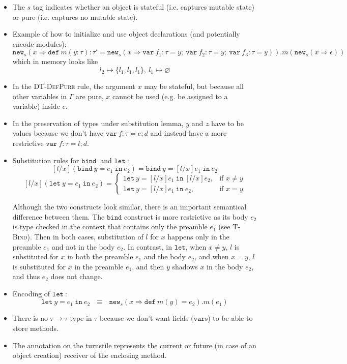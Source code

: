 \documentclass{llncs}
\newcommand{\keywadj}[1]{\mathtt{#1}}
\newcommand{\keyw}[1]{\keywadj{#1}~}
\begin{document}
\begin{itemize}
\item The $s$ tag indicates whether an object is stateful (i.e. captures mutable state) or pure (i.e. captures no mutable state).
\item Example of how to initialize and use object declarations (and potentially encode modules):
\[
\keywadj{new}_{s}(x \Rightarrow \keyw{def} m(y : \tau) : \tau' = \keywadj{new}_{s}(x \Rightarrow \keyw{var} f_1 : \tau = y;~\keyw{var} f_2 : \tau = y;~\keyw{var} f_3 : \tau = y)).m(\keywadj{new}_{s} (x \Rightarrow \epsilon))
\]
which in memory looks like 
\[
l_2 \mapsto \{l_1,l_1,l_1\},~l_1 \mapsto \varnothing
\]
\item In the \textsc{DT-DefPure} rule, the argument $x$ may be stateful, but because all other variables in $\Gamma$ are pure, $x$ cannot be used (e.g. be assigned to a variable) inside $e$.
\item In the preservation of types under substitution lemma, $y$ and $z$ have to be values because we don't have $\keyw{var} f:\tau = e; d$ and instead have a more restrictive $\keyw{var} f:\tau = l;d$.
\item Substitution rules for $\keyw{bind}$ and $\keyw{let}$:
\[
    [l/x](\keyw{bind} y = e_1~\keyw{in} e_2) = \keyw{bind} y = [l/x]e_1~\keyw{in} e_2
\]
\[
    [l/x](\keyw{let} y = e_1~\keyw{in} e_2) = 
\begin{cases}
    \keyw{let} y = [l/x]e_1~\keyw{in} [l/x]e_2, & \text{if } x \not= y\\
    \keyw{let} y = [l/x]e_1~\keyw{in} e_2, & \text{if } x = y
\end{cases}
\]

Although the two constructs look similar, there is an important semantical difference between them. The $\keywadj{bind}$ construct is more restrictive as its body $e_2$ is type checked in the context that contains only the preamble $e_1$ (see \textsc{T-Bind}). Then in both cases, substitution of $l$ for $x$ happens only in the preamble $e_1$ and not in the body $e_2$. In contrast, in $\keywadj{let}$, when $x \not= y$, $l$ is substituted for $x$ in both the preamble $e_1$ and the body $e_2$, and when $x = y$, $l$ is substituted for $x$ in the preamble $e_1$, and then $y$ shadows $x$ in the body $e_2$, and thus $e_2$ does not change. 

\item Encoding of $\keyw{let}$:
\[
\keyw{let} y = e_1~\keyw{in} e_2~~~\equiv~~~\keywadj{new}_s(x \Rightarrow \keyw{def} m(y) = e_2).m(e_1)
\]

\item There is no $\tau \rightarrow \tau$ type in $\tau$ because we don't want fields ($\keywadj{var}$s) to be able to store methods.
\item The annotation on the turnstile represents the current or future (in case of an object creation) receiver of the enclosing method.

\end{itemize}
\end{document}
